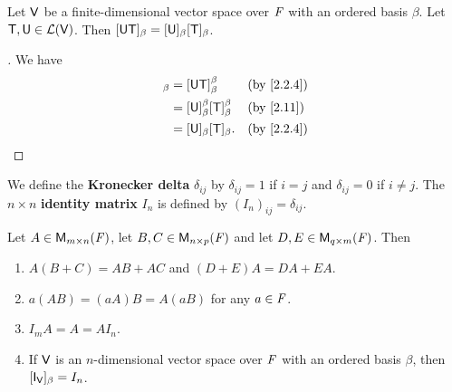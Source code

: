 \begin{cor}\label{2.3.3}
	Let \(\mathsf{V}\) be a finite-dimensional vector space over \(\mathit{F}\) with an ordered basis \(\beta\).
	Let \(\mathsf{T}, \mathsf{U} \in \mathcal{L}(\mathsf{V})\).
	Then \([\mathsf{U} \mathsf{T}]_{\beta} = [\mathsf{U}]_{\beta} [\mathsf{T}]_{\beta}\).
\end{cor}

\begin{proof}[]
	We have
	\begin{align*}
		[\U \T]_{\beta} & = [\U \T]_{\beta}^{\beta}                   &  & \by{2.2.4} \\
		                & = [\U]_{\beta}^{\beta} [\T]_{\beta}^{\beta} &  & \by{2.11}  \\
		                & = [\U]_{\beta} [\T]_{\beta}.                &  & \by{2.2.4}
	\end{align*}
\end{proof}

\begin{defn}\label{2.3.4}
	We define the \textbf{Kronecker delta} \(\delta_{i j}\) by \(\delta_{i j} = 1\) if \(i = j\) and \(\delta_{i j} = 0\) if \(i \neq j\).
	The \(n \times n\) \textbf{identity matrix} \(I_n\) is defined by \((I_n)_{i j} = \delta_{i j}\).
\end{defn}

\begin{thm}\label{2.12}
	Let \(A \in \ms\), let \(B, C \in \ms[n][p][\F]\) and let \(D, E \in \ms[q][m][\F]\).
	Then
	\begin{enumerate}
		\item \(A (B + C) = AB + AC\) and \((D + E) A = DA + EA\).
		\item \(a (AB) = (aA) B = A (aB)\) for any \(a \in \mathit{F}\).
		\item \(I_m A = A = A I_n\).
		\item If \(\mathsf{V}\) is an \(n\)-dimensional vector space over \(\mathit{F}\) with an ordered basis \(\beta\), then \([\IT[\V]]_{\beta} = I_n\).
	\end{enumerate}
\end{thm}

